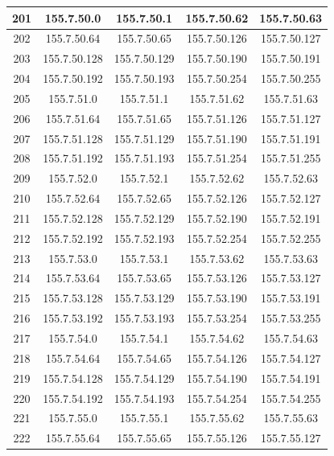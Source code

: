 \documentclass[letterpaper,12pt]{article}
\begin{document}
\begin{longtable}{|c|c|c|c|c|}
        201 & 155.7.50.0 & 155.7.50.1 & 155.7.50.62 & 155.7.50.63 \\ \hline
        202 & 155.7.50.64 & 155.7.50.65 & 155.7.50.126 & 155.7.50.127 \\ \hline
        203 & 155.7.50.128 & 155.7.50.129 & 155.7.50.190 & 155.7.50.191 \\ \hline
        204 & 155.7.50.192 & 155.7.50.193 & 155.7.50.254 & 155.7.50.255 \\ \hline
        205 & 155.7.51.0 & 155.7.51.1 & 155.7.51.62 & 155.7.51.63 \\ \hline
        206 & 155.7.51.64 & 155.7.51.65 & 155.7.51.126 & 155.7.51.127 \\ \hline
        207 & 155.7.51.128 & 155.7.51.129 & 155.7.51.190 & 155.7.51.191 \\ \hline
        208 & 155.7.51.192 & 155.7.51.193 & 155.7.51.254 & 155.7.51.255 \\ \hline
        209 & 155.7.52.0 & 155.7.52.1 & 155.7.52.62 & 155.7.52.63 \\ \hline
        210 & 155.7.52.64 & 155.7.52.65 & 155.7.52.126 & 155.7.52.127 \\ \hline
        211 & 155.7.52.128 & 155.7.52.129 & 155.7.52.190 & 155.7.52.191 \\ \hline
        212 & 155.7.52.192 & 155.7.52.193 & 155.7.52.254 & 155.7.52.255 \\ \hline
        213 & 155.7.53.0 & 155.7.53.1 & 155.7.53.62 & 155.7.53.63 \\ \hline
        214 & 155.7.53.64 & 155.7.53.65 & 155.7.53.126 & 155.7.53.127 \\ \hline
        215 & 155.7.53.128 & 155.7.53.129 & 155.7.53.190 & 155.7.53.191 \\ \hline
        216 & 155.7.53.192 & 155.7.53.193 & 155.7.53.254 & 155.7.53.255 \\ \hline
        217 & 155.7.54.0 & 155.7.54.1 & 155.7.54.62 & 155.7.54.63 \\ \hline
        218 & 155.7.54.64 & 155.7.54.65 & 155.7.54.126 & 155.7.54.127 \\ \hline
        219 & 155.7.54.128 & 155.7.54.129 & 155.7.54.190 & 155.7.54.191 \\ \hline
        220 & 155.7.54.192 & 155.7.54.193 & 155.7.54.254 & 155.7.54.255 \\ \hline
        221 & 155.7.55.0 & 155.7.55.1 & 155.7.55.62 & 155.7.55.63 \\ \hline
        222 & 155.7.55.64 & 155.7.55.65 & 155.7.55.126 & 155.7.55.127 \\ \hline

\end{longtable}
\end{document}
